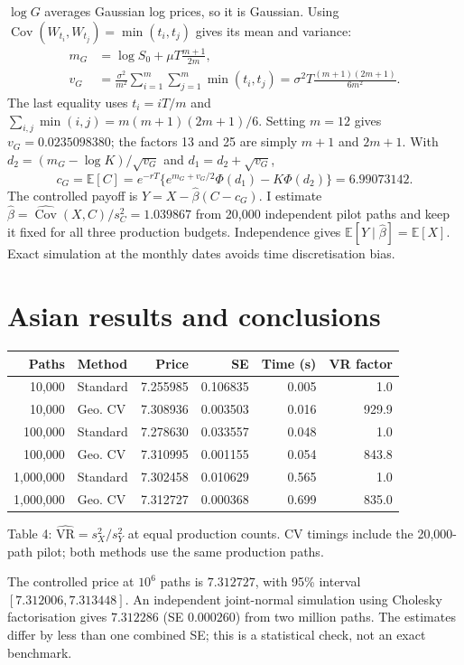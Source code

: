 \documentclass[12pt]{article}
\theoremstyle{definition}
\newcommand{\E}{\mathbb{E}}
\begin{document}
$\log G$ averages Gaussian log prices, so it is Gaussian. Using
$\operatorname{Cov}(W_{t_i},W_{t_j})=\min(t_i,t_j)$ gives its mean and variance:
\begin{align*}
m_G&=\log S_0+\mu T\frac{m+1}{2m},\\
v_G&=\frac{\sigma^2}{m^2}\sum_{i=1}^m\sum_{j=1}^m\min(t_i,t_j)
=\sigma^2T\frac{(m+1)(2m+1)}{6m^2}.
\end{align*}
The last equality uses $t_i=iT/m$ and
$\sum_{i,j}\min(i,j)=m(m+1)(2m+1)/6$. Setting $m=12$ gives
$v_G=0.0235098380$; the factors 13 and 25 are simply $m+1$ and $2m+1$.
With $d_2=(m_G-\log K)/\sqrt{v_G}$ and $d_1=d_2+\sqrt{v_G}$,
\[
c_G=\E[C]=e^{-rT}\{e^{m_G+v_G/2}\Phi(d_1)-K\Phi(d_2)\}=6.99073142.
\]
The controlled payoff is $Y=X-\widehat\beta(C-c_G)$. I estimate
$\widehat\beta=\widehat{\operatorname{Cov}}(X,C)/s_C^2=1.039867$ from 20,000
independent pilot paths and keep it fixed for all three production budgets.
Independence gives $\E[Y\mid\widehat\beta]=\E[X]$. Exact simulation at the monthly dates avoids time discretisation bias.

\newpage
\section{Asian results and conclusions}
\begin{center}
\setlength{\tabcolsep}{5pt}
\begin{tabular}{rlrrrr}
\hline
Paths&Method&Price&SE&Time (s)&VR factor\\\hline
10,000 & Standard & 7.255985 & 0.106835 & 0.005 & 1.0 \\
10,000 & Geo. CV & 7.308936 & 0.003503 & 0.016 & 929.9 \\
100,000 & Standard & 7.278630 & 0.033557 & 0.048 & 1.0 \\
100,000 & Geo. CV & 7.310995 & 0.001155 & 0.054 & 843.8 \\
1,000,000 & Standard & 7.302458 & 0.010629 & 0.565 & 1.0 \\
1,000,000 & Geo. CV & 7.312727 & 0.000368 & 0.699 & 835.0 \\
\hline
\end{tabular}

Table 4: $\widehat{\mathrm{VR}}=s_X^2/s_Y^2$ at equal production counts.
CV timings include the 20,000-path pilot; both methods use the same production paths.
\end{center}

The controlled price at $10^6$ paths is $7.312727$, with 95\% interval
$[7.312006,7.313448]$. An independent joint-normal simulation using Cholesky
factorisation gives $7.312286$ (SE $0.000260$) from two million paths. The estimates
differ by less than one combined SE; this is a statistical check, not an exact benchmark.
\end{document}
